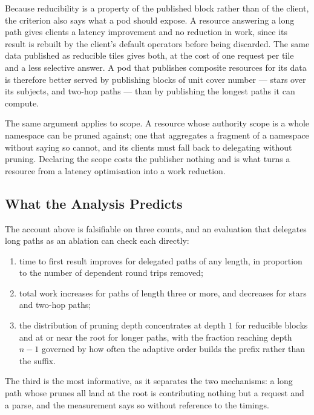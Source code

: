 \documentclass{article}
\begin{document}
Because reducibility is a property of the published block rather than of the client, the
criterion also says what a pod should expose. A resource answering a long path gives
clients a latency improvement and no reduction in work, since its result is rebuilt by
the client's default operators before being discarded. The same data published as
reducible tiles gives both, at the cost of one request per tile and a less selective
answer. A pod that publishes composite resources for its data is therefore better served
by publishing blocks of unit cover number --- stars over its subjects, and two-hop paths
--- than by publishing the longest paths it can compute.

The same argument applies to scope. A resource whose authority scope is a whole
namespace can be pruned against; one that aggregates a fragment of a namespace without
saying so cannot, and its clients must fall back to delegating without pruning. Declaring
the scope costs the publisher nothing and is what turns a resource from a latency
optimisation into a work reduction.

\subsection{What the Analysis Predicts}

The account above is falsifiable on three counts, and an evaluation that delegates long
paths as an ablation can check each directly:

\begin{enumerate}
\item time to first result improves for delegated paths of any length, in proportion to
      the number of dependent round trips removed;
\item total work increases for paths of length three or more, and decreases for stars and
      two-hop paths;
\item the distribution of pruning depth concentrates at depth $1$ for reducible blocks and
      at or near the root for longer paths, with the fraction reaching depth $n-1$
      governed by how often the adaptive order builds the prefix rather than the suffix.
\end{enumerate}

The third is the most informative, as it separates the two mechanisms: a long path whose
prunes all land at the root is contributing nothing but a request and a parse, and the
measurement says so without reference to the timings.
\end{document}
